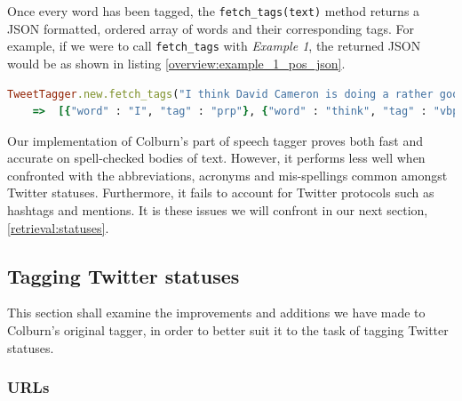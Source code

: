 Once every word has been tagged, the \texttt{fetch\_tags(text)} method returns a JSON formatted, ordered array of words and their corresponding tags. For example, if we were to call \texttt{fetch\_tags} with \emph{Example 1}, the returned JSON would be as shown in listing \ref{overview:example_1_pos_json}.

\begin{lstlisting}[language=Ruby, numbers=none, caption={Returned part of speech tags for \emph{Example 1}}, label=overview:example_1_pos_json]
TweetTagger.new.fetch_tags("I think David Cameron is doing a rather good job: strong leader, holding together seemingly impossible coalition, keeping labour at bay")
	=>	[{"word" : "I", "tag" : "prp"}, {"word" : "think", "tag" : "vbp"}, {"word" : "David", "tag" : "nnp"}, {"word" : "Cameron", "tag" : "nnp"}, {"word" : "is", "tag" : "vbz"}, {"word" : "doing", "tag" : "vbg"}, {"word" : "a", "tag" : "det"}, {"word" : "rather", "tag" : "rb"}, {"word" : "good", "tag" : "jj"}, {"word" : "job", "tag" : "nn"}, {"word" : ":", "tag" : "pps"}, {"word" : "strong", "tag" : "jj"}, {"word" : "leader", "tag" : "nn"}, {"word" : ",", "tag" : "ppc"}, {"word" : "holding", "tag" : "vbg"}, {"word" : "together", "tag" : "rb"}, {"word" : "seemingly", "tag" : "rb"}, {"word" : "impossible", "tag" : "jj"}, {"word" : "coalition", "tag" : "nn"}, {"word" : ",", "tag" : "ppc"}, {"word" : "keeping", "tag" : "vbg"}, {"word" : "labour", "tag" : "nn"}, {"word" : "at", "tag" : "in"}, {"word" : "bay", "tag" : "nn"}]
\end{lstlisting}

Our implementation of Colburn's part of speech tagger proves both fast and accurate on spell-checked bodies of text. However, it performs less well when confronted with the abbreviations, acronyms and mis-spellings common amongst Twitter statuses. Furthermore, it fails to account for Twitter protocols such as hashtags and mentions. It is these issues we will confront in our next section, \ref{retrieval:statuses}.

\subsection{Tagging Twitter statuses}
\label{subjectivity:statuses}

This section shall examine the improvements and additions we have made to Colburn's original tagger, in order to better suit it to the task of tagging Twitter statuses.

\subsubsection{URLs}
\label{subjectivity:urls}

